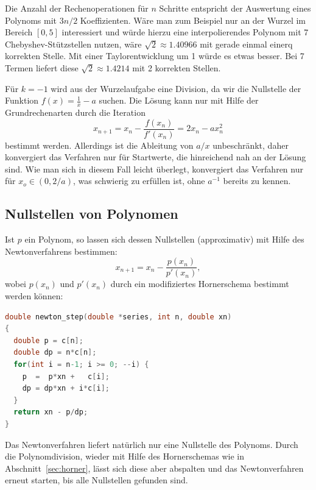 Die Anzahl der Rechenoperationen für $n$ Schritte entspricht der
Auswertung eines Polynoms mit $3n/2$ Koeffizienten. Wäre man zum
Beispiel nur an der Wurzel im Bereich $[0,5]$ interessiert und würde
hierzu eine interpolierendes Polynom mit 7 Chebyshev-Stützstellen
nutzen, wäre $\sqrt{2}\approx 1.40966$ mit gerade einmal einerq
korrekten Stelle. Mit einer Taylorentwicklung um 1 würde es etwas
besser. Bei 7 Termen liefert diese $\sqrt{2}\approx 1.4214$ mit 2
korrekten Stellen.

Für $k=-1$ wird aus der Wurzelaufgabe eine Division, da wir die
Nullstelle der Funktion $f(x) = \frac{1}{x} - a$ suchen. Die Lösung
kann nur mit Hilfe der Grundrechenarten durch die Iteration
\begin{equation}
  x_{n+1} = x_n - \frac{f(x_n)}{f'(x_n)} = 2x_n - a x_n^2 
\end{equation}
bestimmt werden. Allerdings ist die Ableitung von $a/x$ unbeschränkt,
daher konvergiert das Verfahren nur für Startwerte, die hinreichend
nah an der Lösung sind. Wie man sich in diesem Fall leicht überlegt,
konvergiert das Verfahren nur für $x_o\in (0, 2/a)$, was schwierig zu
erfüllen ist, ohne $a^{-1}$ bereits zu kennen.

\subsection{Nullstellen von Polynomen}

Ist $p$ ein Polynom, so lassen sich dessen Nullstellen (approximativ)
mit Hilfe des Newtonverfahrens bestimmen:
\begin{equation}
  x_{n+1} = x_n - \frac{p(x_n)}{p'(x_n)},
\end{equation}
wobei $p(x_n)$ und $p'(x_n)$ durch ein modifiziertes Hornerschema
bestimmt werden können:
\begin{lstlisting}[language=C]
double newton_step(double *series, int n, double xn)
{
  double p = c[n];
  double dp = n*c[n];
  for(int i = n-1; i >= 0; --i) {
    p  =  p*xn +   c[i];
    dp = dp*xn + i*c[i];
  }
  return xn - p/dp;
}
\end{lstlisting}
Das Newtonverfahren liefert natürlich nur eine Nullstelle des
Polynoms. Durch die Polynomdivision, wieder mit Hilfe des
Hornerschemas wie in Abschnitt~\ref{sec:horner}, lässt sich diese
aber abspalten und das Newtonverfahren erneut starten, bis alle
Nullstellen gefunden sind.

\section{}

